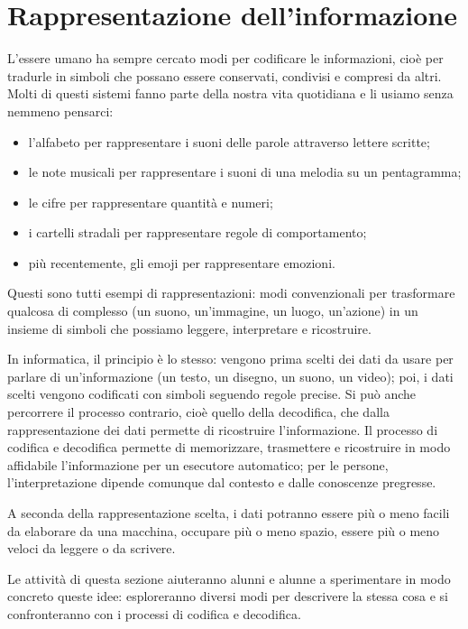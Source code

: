 \chapter{Rappresentazione dell'informazione}\label{capitolo-5-rappresentazione-dellinformazione}

L'essere umano ha sempre cercato modi per codificare le informazioni, cioè per tradurle in simboli che possano essere conservati, condivisi e compresi da altri. Molti di questi sistemi fanno parte della nostra vita quotidiana e li usiamo senza nemmeno pensarci:

\begin{itemize}
\item
  l'alfabeto per rappresentare i suoni delle parole attraverso lettere scritte;
\item
  le note musicali per rappresentare i suoni di una melodia su un pentagramma;
\item
  le cifre per rappresentare quantità e numeri;
\item
  i cartelli stradali per rappresentare regole di comportamento;
\item
  più recentemente, gli emoji per rappresentare emozioni.
\end{itemize}

Questi sono tutti esempi di rappresentazioni: modi convenzionali per trasformare qualcosa di complesso (un suono, un'immagine, un luogo, un'azione) in un insieme di simboli che possiamo leggere, interpretare e ricostruire.

In informatica, il principio è lo stesso: vengono prima scelti dei dati da usare per parlare di un'informazione (un testo, un disegno, un suono, un video); poi, i dati scelti vengono codificati con simboli seguendo regole precise. Si può anche percorrere il processo contrario, cioè quello della decodifica, che dalla rappresentazione dei dati permette di ricostruire l'informazione. Il processo di codifica e decodifica permette di memorizzare, trasmettere e ricostruire in modo affidabile l'informazione per un esecutore automatico; per le persone, l'interpretazione dipende comunque dal contesto e dalle conoscenze pregresse.

A seconda della rappresentazione scelta, i dati potranno essere più o meno facili da elaborare da una macchina, occupare più o meno spazio, essere più o meno veloci da leggere o da scrivere.

Le attività di questa sezione aiuteranno alunni e alunne a sperimentare in modo concreto queste idee: esploreranno diversi modi per descrivere la stessa cosa e si confronteranno con i processi di codifica e decodifica.

